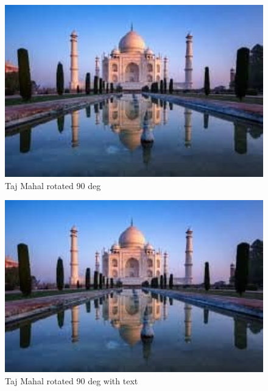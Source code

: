 \documentclass{article}
\begin{document}
	\begin{figure}[h!]
		\centering
		\includegraphics[width=1\textwidth, angle=90]{images/taj.jpg}    %
		\caption{Taj Mahal rotated 90 deg}
		\label{tajrot90}
	\end{figure}

	\begin{figure}
		\centering
		\includegraphics[width=1\textwidth]{images/taj.jpg}    %
		\caption{Taj Mahal rotated 90 deg with text}
		\label{tajrot90_side}
	\end{figure}
\end{document}
